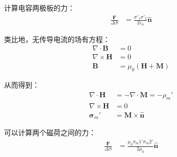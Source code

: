 \documentclass[12pt,onecolumn,a4paper]{book}
\numberwithin{table}{subsection}
\numberwithin{equation}{subsection}
\begin{document}
    计算电容两极板的力：
    \begin{align}
        \frac{\mathbf{F}}{\Delta S} & = \frac{\sigma'_1 \sigma'_2}{2\varepsilon_0} \hat{\mathbf{n}}
    \end{align}

    类比地，无传导电流的场有方程：
    \begin{align}
        \nabla \cdot \mathbf{B}  & = 0                               \\
        \nabla \times \mathbf{H} & = 0                               \\
        \mathbf{B}               & = \mu_0 (\mathbf{H} + \mathbf{M})
    \end{align}

    从而得到：
    \begin{align}
        \nabla \cdot \mathbf{H}  & = - \nabla \cdot  \mathbf{M} = - \rho_m' \\
        \nabla \times \mathbf{H} & = 0                                      \\
        \mathbf{\sigma}_m'       & = \mathbf{M} \times \hat{\mathbf{n}}
    \end{align}

    可以计算两个磁荷之间的力：
    \begin{align}
        \frac{\mathbf{F}}{\Delta S} & = \frac{\mu_0\sigma_m1' \sigma_m2'}{2\mu_0} \hat{\mathbf{n}}
    \end{align}
\end{document}
